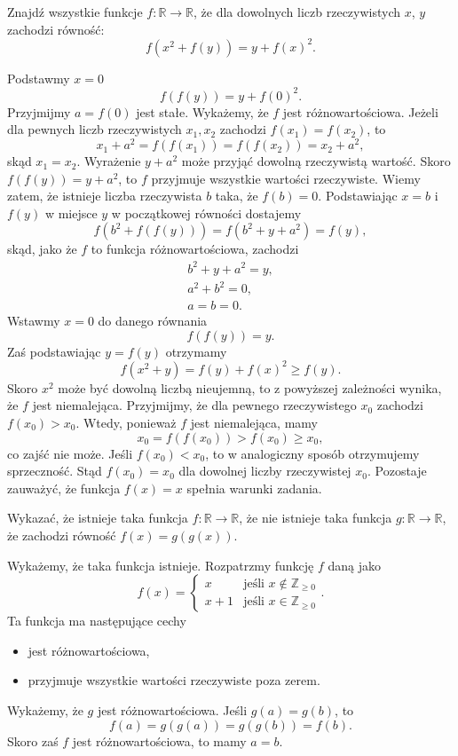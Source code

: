 \begin{problem}{5}
	Znajdź wszystkie funkcje $f:\mathbb{R}\longrightarrow\mathbb{R}$, że dla dowolnych liczb rzeczywistych $x$, $y$ zachodzi równość:
	\[
		f(x^2 + f(y)) = y + f(x)^2.
	\]
\end{problem}


\noindent
Podstawmy $x = 0$ 
\[
	f(f(y)) = y + f(0)^2.
\] 
Przyjmijmy $a = f(0)$ jest stałe. Wykażemy, że $f$ jest różnowartościowa. Jeżeli dla pewnych liczb rzeczywistych $x_1, x_2$ zachodzi $f(x_1) = f(x_2)$, to 
\[
	x_1 + a^2 = f(f(x_1)) = f(f(x_2)) = x_2 + a^2,
\]
skąd $x_1 = x_2$.
Wyrażenie $y + a^2$ może przyjąć dowolną rzeczywistą wartość. Skoro $f(f(y)) = y + a^2$, to $f$ przyjmuje wszystkie wartości rzeczywiste.
Wiemy zatem, że istnieje liczba rzeczywista $b$ taka, że $f(b) = 0$. Podstawiając $x = b$ i $f(y)$ w miejsce $y$ w początkowej równości dostajemy 
\[
	f(b^2 + f(f(y))) = f(b^2 + y + a^2) = f(y),
\]
skąd, jako że $f$ to funkcja różnowartościowa, zachodzi 
\begin{align*}
	b^2 + y + a^2 = y, \\
	a^2 + b^2 = 0, \\
	a = b = 0.
\end{align*}
Wstawmy $x = 0$ do danego równania 
\[
	f(f(y)) = y.
\] 
Zaś podstawiając $y = f(y)$  otrzymamy 
\[
	f(x^2 + y) = f(y) + f(x)^2 \geqslant f(y).
\]
Skoro $x^2$ może być dowolną liczbą nieujemną, to z powyższej zależności wynika, że $f$ jest niemalejąca. Przyjmijmy, że dla pewnego rzeczywistego $x_0$ zachodzi $f(x_0) > x_0$. Wtedy, ponieważ $f$ jest niemalejąca,
mamy 
\[
	x_0 = f(f(x_0)) > f(x_0) \geqslant x_0,
\] 
co zajść nie może. Jeśli $f(x_0) < x_0$, to w analogiczny sposób otrzymujemy sprzeczność. Stąd $f(x_0) = x_0$ dla dowolnej liczby rzeczywistej $x_0$. Pozostaje zauważyć, że funkcja $f(x) = x$ spełnia warunki zadania.

\vspace{10px}

\begin{problem}{6}
	Wykazać, że istnieje taka funkcja $f:\mathbb{R}\longrightarrow\mathbb{R}$, że nie istnieje taka funkcja $g:\mathbb{R}\longrightarrow\mathbb{R}$, że zachodzi równość $f(x) = g(g(x))$.
\end{problem}

\noindent
Wykażemy, że taka funkcja istnieje. Rozpatrzmy funkcję $f$ daną jako
\[
	f(x) = 	\begin{cases} 
				x &\mbox{jeśli } x \notin \mathbb{Z}_{\geqslant 0} \\ 
				x + 1 & \mbox{jeśli } x \in \mathbb{Z}_{\geqslant 0}
			\end{cases}.
\]
Ta funkcja ma następujące cechy
\begin{itemize}
	\item jest różnowartościowa,
	\item przyjmuje wszystkie wartości rzeczywiste poza zerem.
\end{itemize}
Wykażemy, że $g$ jest różnowartościowa. Jeśli $g(a) = g(b)$, to
\[
	f(a) = g(g(a)) = g(g(b)) = f(b).
\]
Skoro zaś $f$ jest różnowartościowa, to mamy $a = b$.

